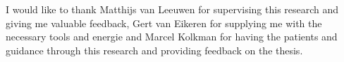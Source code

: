 


\begin{acknowledgements}
I would like to thank Matthijs van Leeuwen for supervising this research and giving me valuable feedback, Gert van Eikeren for supplying me with the necessary tools and energie and Marcel Kolkman for having the patients and guidance through this research and providing feedback on the thesis.

\end{acknowledgements}
